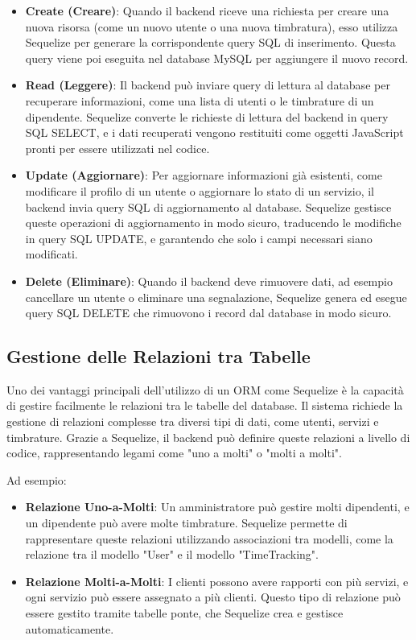 \documentclass[twoside]{supsistudent}
\begin{document}
\begin{itemize}
  \item \textbf{Create (Creare)}: Quando il backend riceve una richiesta per creare una nuova risorsa (come un nuovo utente o una nuova timbratura), esso utilizza Sequelize per generare la corrispondente query SQL di inserimento. Questa query viene poi eseguita nel database MySQL per aggiungere il nuovo record.

  \item \textbf{Read (Leggere)}: Il backend può inviare query di lettura al database per recuperare informazioni, come una lista di utenti o le timbrature di un dipendente. Sequelize converte le richieste di lettura del backend in query SQL SELECT, e i dati recuperati vengono restituiti come oggetti JavaScript pronti per essere utilizzati nel codice.

  \item \textbf{Update (Aggiornare)}: Per aggiornare informazioni già esistenti, come modificare il profilo di un utente o aggiornare lo stato di un servizio, il backend invia query SQL di aggiornamento al database. Sequelize gestisce queste operazioni di aggiornamento in modo sicuro, traducendo le modifiche in query SQL UPDATE, e garantendo che solo i campi necessari siano modificati.

  \item \textbf{Delete (Eliminare)}: Quando il backend deve rimuovere dati, ad esempio cancellare un utente o eliminare una segnalazione, Sequelize genera ed esegue query SQL DELETE che rimuovono i record dal database in modo sicuro.
\end{itemize}

\subsection{Gestione delle Relazioni tra Tabelle}

Uno dei vantaggi principali dell'utilizzo di un ORM come Sequelize è la capacità di gestire facilmente le relazioni tra le tabelle del database. Il sistema richiede la gestione di relazioni complesse tra diversi tipi di dati, come utenti, servizi e timbrature. Grazie a Sequelize, il backend può definire queste relazioni a livello di codice, rappresentando legami come "uno a molti" o "molti a molti".

Ad esempio:

\begin{itemize}
  \item \textbf{Relazione Uno-a-Molti}: Un amministratore può gestire molti dipendenti, e un dipendente può avere molte timbrature. Sequelize permette di rappresentare queste relazioni utilizzando associazioni tra modelli, come la relazione tra il modello "User" e il modello "TimeTracking".

  \item \textbf{Relazione Molti-a-Molti}: I clienti possono avere rapporti con più servizi, e ogni servizio può essere assegnato a più clienti. Questo tipo di relazione può essere gestito tramite tabelle ponte, che Sequelize crea e gestisce automaticamente.
\end{itemize}
\end{document}
